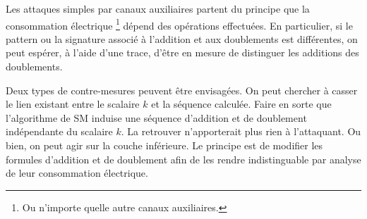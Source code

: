 Les attaques simples par canaux auxiliaires partent du principe que la consommation électrique \footnote{Ou n'importe quelle autre canaux auxiliaires.} dépend des opérations effectuées. En particulier, si le pattern ou la \og signature \fg{} associé à l'addition et aux doublements est différentes, on peut espérer, à l'aide d'une trace, d'être en mesure de distinguer les additions des doublements.

Deux types de contre-mesures peuvent être envisagées. On peut chercher à casser le lien existant entre le scalaire $k$ et la séquence calculée. Faire en sorte que l'algorithme de SM induise une séquence d'addition et de doublement indépendante du scalaire $k$. La retrouver n'apporterait plus rien à l'attaquant. Ou bien, on peut agir sur la couche inférieure. Le principe est de modifier les formules d'addition et de doublement afin de les rendre indistinguable par analyse de leur consommation électrique. 


